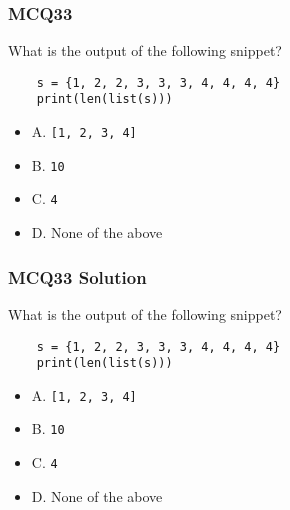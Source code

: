 \documentclass{beamer}
\begin{document}
\begin{frame}[fragile]
    \frametitle{MCQ33}
    What is the output of the following snippet?
    \begin{verbatim}
    s = {1, 2, 2, 3, 3, 3, 4, 4, 4, 4}
    print(len(list(s)))
    \end{verbatim}
    \begin{itemize}
        \item A. \texttt{[1, 2, 3, 4]}
        \item B. \texttt{10}
        \item C. \texttt{4}
        \item D. None of the above
    \end{itemize}
\end{frame}
\begin{frame}[fragile]
    \frametitle{MCQ33 Solution}
    What is the output of the following snippet?
    \begin{verbatim}
    s = {1, 2, 2, 3, 3, 3, 4, 4, 4, 4}
    print(len(list(s)))
    \end{verbatim}
    \begin{itemize}
        \item A. \texttt{[1, 2, 3, 4]}
        \item B. \texttt{10}
        \item \alert{C. \texttt{4}}
        \item D. None of the above
    \end{itemize}
\end{frame}
\end{document}
